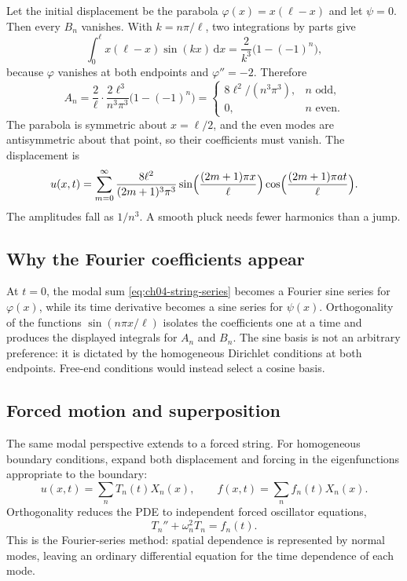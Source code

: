 \begin{example}
Let the initial displacement be the parabola $\varphi(x)=x(\ell-x)$ and let $\psi=0$. Then every $B_n$ vanishes. With $k=n\pi/\ell$, two integrations by parts give
\begin{equation}
\int_0^{\ell}x(\ell-x)\sin(kx)\,\mathrm{d}x
=\frac{2}{k^3}\bigl(1-(-1)^n\bigr),
\end{equation}
because $\varphi$ vanishes at both endpoints and $\varphi''=-2$. Therefore
\begin{equation}
A_n=\frac{2}{\ell}\cdot\frac{2\ell^3}{n^3\pi^3}\bigl(1-(-1)^n\bigr)
=
\begin{cases}
8\ell^2/(n^3\pi^3),& n\text{ odd},\\
0,& n\text{ even}.
\end{cases}
\end{equation}
The parabola is symmetric about $x=\ell/2$, and the even modes are antisymmetric about that point, so their coefficients must vanish. The displacement is
\begin{equation}
u(x,t)=\sum_{m=0}^{\infty}
\frac{8\ell^2}{(2m+1)^3\pi^3}
\sin\Bigl(\frac{(2m+1)\pi x}{\ell}\Bigr)
\cos\Bigl(\frac{(2m+1)\pi a t}{\ell}\Bigr).
\end{equation}
The amplitudes fall as $1/n^3$. A smooth pluck needs fewer harmonics than a jump.
\end{example}

\subsection{Why the Fourier coefficients appear}

At $t=0$, the modal sum \eqref{eq:ch04-string-series} becomes a Fourier sine series for $\varphi(x)$, while its time derivative becomes a sine series for $\psi(x)$. Orthogonality of the functions $\sin(n\pi x/\ell)$ isolates the coefficients one at a time and produces the displayed integrals for $A_n$ and $B_n$. The sine basis is not an arbitrary preference: it is dictated by the homogeneous Dirichlet conditions at both endpoints. Free-end conditions would instead select a cosine basis.

\subsection{Forced motion and superposition}

The same modal perspective extends to a forced string. For homogeneous boundary conditions, expand both displacement and forcing in the eigenfunctions appropriate to the boundary:
\begin{equation}
u(x,t)=\sum_n T_n(t)X_n(x),
\qquad
f(x,t)=\sum_n f_n(t)X_n(x).
\end{equation}
Orthogonality reduces the PDE to independent forced oscillator equations,
\begin{equation}
T_n''+\omega_n^2T_n=f_n(t).
\end{equation}
This is the Fourier-series method: spatial dependence is represented by normal modes, leaving an ordinary differential equation for the time dependence of each mode.

